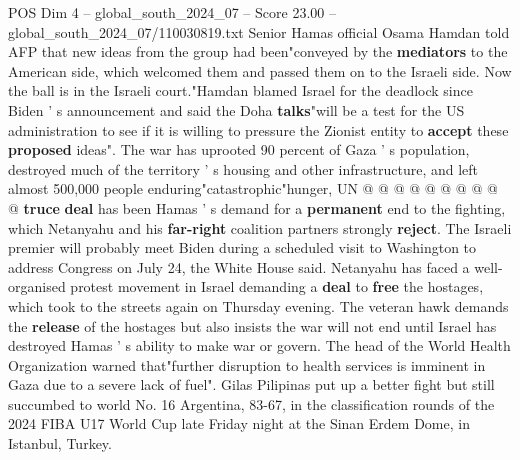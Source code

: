 \begin{textsample}{POS Dim 4 – global\_south\_2024\_07 – Score 23.00 – global\_south\_2024\_07/110030819.txt}
Senior Hamas official Osama Hamdan told AFP that new ideas from the group had been"conveyed by the \textbf{mediators} to the American side, which welcomed them and passed them on to the Israeli side.
Now the ball is in the Israeli court."Hamdan blamed Israel for the deadlock since Biden ' s announcement and said the Doha \textbf{talks}"will be a test for the US administration to see if it is willing to pressure the Zionist entity to \textbf{accept} these \textbf{proposed} ideas".
The war has uprooted 90 percent of Gaza ' s population, destroyed much of the territory ' s housing and other infrastructure, and left almost 500,000 people enduring"catastrophic"hunger, UN @ @ @ @ @ @ @ @ @ @ \textbf{truce} \textbf{deal} has been Hamas ' s demand for a \textbf{permanent} end to the fighting, which Netanyahu and his \textbf{far-right} coalition partners strongly \textbf{reject}.
The Israeli premier will probably meet Biden during a scheduled visit to Washington to address Congress on July 24, the White House said.
Netanyahu has faced a well-organised protest movement in Israel demanding a \textbf{deal} to \textbf{free} the hostages, which took to the streets again on Thursday evening.
The veteran hawk demands the \textbf{release} of the hostages but also insists the war will not end until Israel has destroyed Hamas ' s ability to make war or govern.
The head of the World Health Organization warned that"further disruption to health services is imminent in Gaza due to a severe lack of fuel".
Gilas Pilipinas put up a better fight but still succumbed to world No. 16 Argentina, 83-67, in the classification rounds of the 2024 FIBA U17 World Cup late Friday night at the Sinan Erdem Dome, in Istanbul, Turkey.

\end{textsample}
